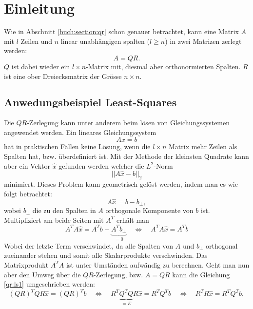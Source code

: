 %
%
%
\section{Einleitung\label{qr:section:einleitung}}
Wie in Abschnitt \ref{buch:section:qr} schon genauer betrachtet, kann eine Matrix $A$ mit $l$ Zeilen und $n$ linear unabhängigen spalten ($l\ge n$) in zwei Matrizen zerlegt werden:
\begin{equation*}
A=QR.
\end{equation*}
$Q$ ist dabei wieder ein $l\times n$-Matrix mit, diesmal aber orthonormierten Spalten.
$R$ ist eine ober Dreiecksmatrix der Grösse $n\times n$.

\subsection{Anwedungsbeispiel Least-Squares}
Die $QR$-Zerlegung kann unter anderem beim lösen von Gleichungssystemen angewendet werden.
Ein lineares Gleichungssystem
\begin{equation}
Ax=b\label{qr:sle}
\end{equation}
hat in praktischen Fällen keine Lösung, wenn die $l\times n$ Matrix mehr Zeilen als Spalten hat, bzw. überdefiniert ist.
Mit der Methode der kleinsten Quadrate kann aber ein Vektor $\hat{x}$ gefunden werden welcher die $L^2$-Norm
\begin{equation*}
||A\hat{x}-b||_2
\end{equation*}
minimiert.
Dieses Problem kann geometrisch gelöst werden, indem man es wie folgt betrachtet:
\begin{equation*}
A\hat{x}=b-b_{\perp},
\end{equation*}
wobei $b_{\perp}$ die zu den Spalten in $A$ orthogonale Komponente von $b$ ist.
Multipliziert am beide Seiten mit $A^T$ erhält man
\begin{equation}
A^TA\hat{x}=A^Tb-\underbrace{A^Tb_{\perp}}_{=0}
\quad\Leftrightarrow\quad A^TA\hat{x}=A^Tb \label{qr:ls1}
\end{equation}
Wobei der letzte Term verschwindet, da alle Spalten von $A$ und $b_{\perp}$ orthogonal zueinander stehen und somit alle Skalarprodukte verschwinden.
Das Matrixprodukt $A^TA$ ist unter Umständen aufwändig zu berechnen.
Geht man nun aber den Umweg über die $QR$-Zerlegung, bzw. $A=QR$ kann die Gleichung \ref{qr:ls1} umgeschrieben werden:
\begin{equation*}
(QR)^TQR\hat{x}=(QR)^Tb \quad \Leftrightarrow \quad R^T\underbrace{Q^TQ}_{=E}R\hat{x}= R^TQ^Tb \quad \Leftrightarrow \quad
R^TR\hat{x}=R^TQ^Tb,
\end{equation*}
